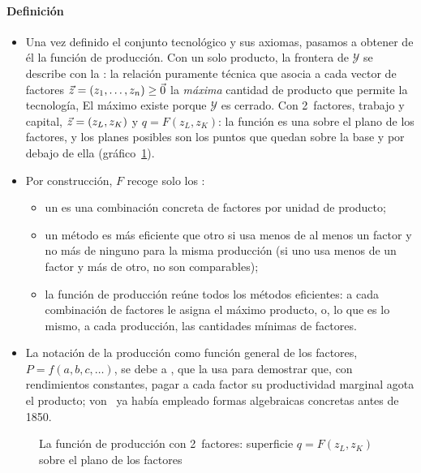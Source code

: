 \documentclass[11pt]{article}
\begin{document}
\paragraph{Definición}

\begin{itemize}
\item Una vez definido el conjunto tecnológico y sus axiomas, pasamos a obtener de él la función de producción. Con un solo producto, la frontera de $\mathcal{Y}$ se describe con la : la relación puramente técnica que asocia a cada vector de factores $\vec{z}=(z_1,\dots,z_n)\geq\vec{0}$ la \emph{máxima} cantidad de producto que permite la tecnología,
  El máximo existe porque $\mathcal{Y}$ es cerrado. Con 2~factores, trabajo y capital, $\vec{z}=(z_L,z_K)$ y $q=F(z_L,z_K)$: la función es una  sobre el plano de los factores, y los planes posibles son los puntos que quedan sobre la base y por debajo de ella (gráfico~\ref{fig:funcion-produccion-3d}).
\item Por construcción, $F$ recoge solo los :
  \begin{itemize}
  \item un  es una combinación concreta de factores por unidad de producto;
  \item un método es más eficiente que otro si usa menos de al menos un factor y no más de ninguno para la misma producción (si uno usa menos de un factor y más de otro, no son comparables);
  \item la función de producción reúne todos los métodos eficientes: a cada combinación de factores le asigna el máximo producto, o, lo que es lo mismo, a cada producción, las cantidades mínimas de factores.
  \end{itemize}
\item La notación de la producción como función general de los factores, $P=f(a,b,c,\dots)$, se debe a \textcite{Wicksteed1894Essay}, que la usa para demostrar que, con rendimientos constantes, pagar a cada factor su productividad marginal agota el producto; von~ ya había empleado formas algebraicas concretas antes de 1850\nocite{Humphrey1997Algebraic}.
\end{itemize}

\begin{figure}[H]
\centering
\caption{La función de producción con 2~factores: superficie $q=F(z_L,z_K)$ sobre el plano de los factores}\label{fig:funcion-produccion-3d}
\end{figure}
\end{document}
